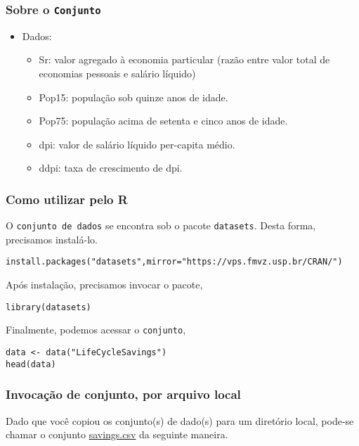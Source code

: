 \documentclass[12pt]{article}
\begin{document}
\subsubsection{Sobre o \texttt{Conjunto}}
\label{sec:orgd10e961}
\begin{itemize}
\item Dados:
\begin{itemize}
\item Sr: valor agregado à economia particular (razão entre valor total de economias pessoais e salário líquido)
\item Pop15: população sob quinze anos de idade.
\item Pop75: população acima de setenta e cinco anos de idade.
\item dpi: valor de salário líquido per-capita médio.
\item ddpi: taxa de crescimento de dpi.
\end{itemize}
\end{itemize}

\subsubsection{Como utilizar pelo R}
\label{sec:orge7010a6}
O \texttt{conjunto de dados} se encontra sob o pacote \texttt{datasets}. Desta forma, precisamos
instalá-lo.

\begin{verbatim}
install.packages("datasets",mirror="https://vps.fmvz.usp.br/CRAN/")
\end{verbatim}

Após instalação, precisamos invocar o pacote,
\begin{verbatim}
library(datasets)
\end{verbatim}

Finalmente, podemos acessar o \texttt{conjunto},
\begin{verbatim}
data <- data("LifeCycleSavings")
head(data)
\end{verbatim}
\subsubsection{Invocação de conjunto, por arquivo local}
\label{sec:org8996014}

Dado que você copiou os conjunto(s) de dado(s) para um diretório
local, pode-se chamar o conjunto \href{https://drive.google.com/file/d/1j2K7J1rb3V2Qr\_t0rcBhA6tyuqh88AjY/view?usp=sharing}{savings.csv} da seguinte maneira.
\end{document}
